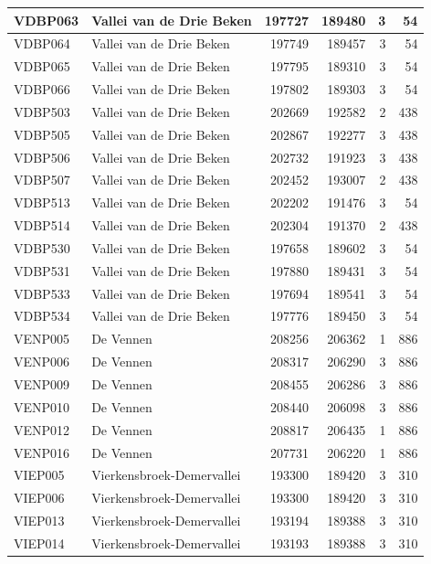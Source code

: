 \documentclass[11pt,]{book}
\begin{document}
\begin{table}
\begin{tabular}[t]{l|l|r|r|r|r}
\hline
VDBP063 & Vallei van de Drie Beken & 197727 & 189480 & 3 & 54\\
\hline
VDBP064 & Vallei van de Drie Beken & 197749 & 189457 & 3 & 54\\
\hline
VDBP065 & Vallei van de Drie Beken & 197795 & 189310 & 3 & 54\\
\hline
VDBP066 & Vallei van de Drie Beken & 197802 & 189303 & 3 & 54\\
\hline
VDBP503 & Vallei van de Drie Beken & 202669 & 192582 & 2 & 438\\
\hline
VDBP505 & Vallei van de Drie Beken & 202867 & 192277 & 3 & 438\\
\hline
VDBP506 & Vallei van de Drie Beken & 202732 & 191923 & 3 & 438\\
\hline
VDBP507 & Vallei van de Drie Beken & 202452 & 193007 & 2 & 438\\
\hline
VDBP513 & Vallei van de Drie Beken & 202202 & 191476 & 3 & 54\\
\hline
VDBP514 & Vallei van de Drie Beken & 202304 & 191370 & 2 & 438\\
\hline
VDBP530 & Vallei van de Drie Beken & 197658 & 189602 & 3 & 54\\
\hline
VDBP531 & Vallei van de Drie Beken & 197880 & 189431 & 3 & 54\\
\hline
VDBP533 & Vallei van de Drie Beken & 197694 & 189541 & 3 & 54\\
\hline
VDBP534 & Vallei van de Drie Beken & 197776 & 189450 & 3 & 54\\
\hline
VENP005 & De Vennen & 208256 & 206362 & 1 & 886\\
\hline
VENP006 & De Vennen & 208317 & 206290 & 3 & 886\\
\hline
VENP009 & De Vennen & 208455 & 206286 & 3 & 886\\
\hline
VENP010 & De Vennen & 208440 & 206098 & 3 & 886\\
\hline
VENP012 & De Vennen & 208817 & 206435 & 1 & 886\\
\hline
VENP016 & De Vennen & 207731 & 206220 & 1 & 886\\
\hline
VIEP005 & Vierkensbroek-Demervallei & 193300 & 189420 & 3 & 310\\
\hline
VIEP006 & Vierkensbroek-Demervallei & 193300 & 189420 & 3 & 310\\
\hline
VIEP013 & Vierkensbroek-Demervallei & 193194 & 189388 & 3 & 310\\
\hline
VIEP014 & Vierkensbroek-Demervallei & 193193 & 189388 & 3 & 310\\
\hline

\end{tabular}
\end{table}
\end{document}

